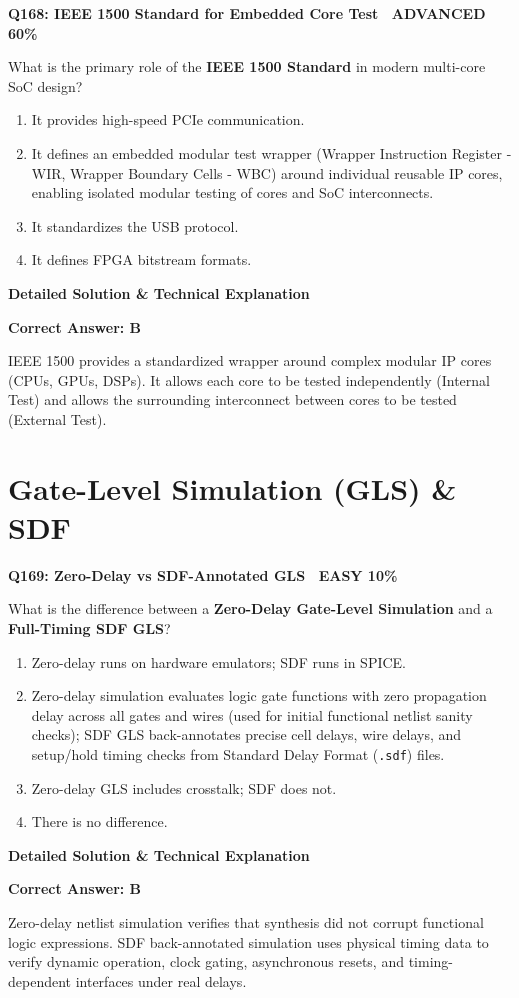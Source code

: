 \documentclass[11pt,a4paper]{article}
\newcommand{\badgeadv}{{\color{white}\colorbox{advred}{\bfseries\sffamily\tiny\ ADVANCED 60\%\ }}}
\newcommand{\badgeeasy}{{\color{white}\colorbox{easygreen}{\bfseries\sffamily\tiny\ EASY 10\%\ }}}
\newenvironment{qbox}[2]{%
  \begin{mdframed}[style=qstyle]%
  {\bfseries\sffamily\color{primaryblue}#1 \hfill #2}\par\vspace{2pt}%
}{%
  \end{mdframed}%
}
\newenvironment{ansbox}{%
  \begin{mdframed}[style=ansstyle]%
  {\bfseries\sffamily\color{ansgreen}\small Detailed Solution \& Technical Explanation}\par\vspace{2pt}\small%
}{%
  \end{mdframed}%
}
\begin{document}
\begin{qbox}{Q168: IEEE 1500 Standard for Embedded Core Test}{\badgeadv}
What is the primary role of the \textbf{IEEE 1500 Standard} in modern multi-core SoC design?
\begin{enumerate}[label=\textbf{\Alph*.}]
  \item It provides high-speed PCIe communication.
  \item It defines an embedded modular test wrapper (Wrapper Instruction Register - WIR, Wrapper Boundary Cells - WBC) around individual reusable IP cores, enabling isolated modular testing of cores and SoC interconnects.
  \item It standardizes the USB protocol.
  \item It defines FPGA bitstream formats.
\end{enumerate}
\end{qbox}
\begin{ansbox}
\textbf{Correct Answer: B}

IEEE 1500 provides a standardized wrapper around complex modular IP cores (CPUs, GPUs, DSPs). It allows each core to be tested independently (Internal Test) and allows the surrounding interconnect between cores to be tested (External Test).
\end{ansbox}

\section{Gate-Level Simulation (GLS) \& SDF}

\begin{qbox}{Q169: Zero-Delay vs SDF-Annotated GLS}{\badgeeasy}
What is the difference between a \textbf{Zero-Delay Gate-Level Simulation} and a \textbf{Full-Timing SDF GLS}?
\begin{enumerate}[label=\textbf{\Alph*.}]
  \item Zero-delay runs on hardware emulators; SDF runs in SPICE.
  \item Zero-delay simulation evaluates logic gate functions with zero propagation delay across all gates and wires (used for initial functional netlist sanity checks); SDF GLS back-annotates precise cell delays, wire delays, and setup/hold timing checks from Standard Delay Format (\texttt{.sdf}) files.
  \item Zero-delay GLS includes crosstalk; SDF does not.
  \item There is no difference.
\end{enumerate}
\end{qbox}
\begin{ansbox}
\textbf{Correct Answer: B}

Zero-delay netlist simulation verifies that synthesis did not corrupt functional logic expressions. SDF back-annotated simulation uses physical timing data to verify dynamic operation, clock gating, asynchronous resets, and timing-dependent interfaces under real delays.
\end{ansbox}
\end{document}
